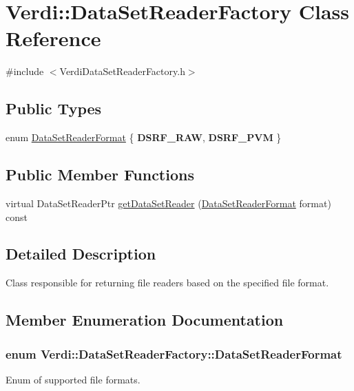 \hypertarget{class_verdi_1_1_data_set_reader_factory}{\section{\-Verdi\-:\-:\-Data\-Set\-Reader\-Factory \-Class \-Reference}
\label{class_verdi_1_1_data_set_reader_factory}
}


{\ttfamily \#include $<$\-Verdi\-Data\-Set\-Reader\-Factory.\-h$>$}

\subsection*{\-Public \-Types}
\begin{DoxyCompactItemize}
\item 
enum \hyperlink{class_verdi_1_1_data_set_reader_factory_a2c02a5a07ac022affe10410957967910}{\-Data\-Set\-Reader\-Format} \{ {\bfseries \-D\-S\-R\-F\-\_\-\-R\-A\-W}, 
{\bfseries \-D\-S\-R\-F\-\_\-\-P\-V\-M}
 \}
\end{DoxyCompactItemize}
\subsection*{\-Public \-Member \-Functions}
\begin{DoxyCompactItemize}
\item 
virtual \-Data\-Set\-Reader\-Ptr \hyperlink{class_verdi_1_1_data_set_reader_factory_aad311b871f57cc3ce836c5d08947e845}{get\-Data\-Set\-Reader} (\hyperlink{class_verdi_1_1_data_set_reader_factory_a2c02a5a07ac022affe10410957967910}{\-Data\-Set\-Reader\-Format} format) const 
\end{DoxyCompactItemize}


\subsection{\-Detailed \-Description}
\-Class responsible for returning file readers based on the specified file format. 

\subsection{\-Member \-Enumeration \-Documentation}
\hypertarget{class_verdi_1_1_data_set_reader_factory_a2c02a5a07ac022affe10410957967910}{
\subsubsection[{\-Data\-Set\-Reader\-Format}]{\setlength{\rightskip}{0pt plus 5cm}enum {\bf \-Verdi\-::\-Data\-Set\-Reader\-Factory\-::\-Data\-Set\-Reader\-Format}}}\label{class_verdi_1_1_data_set_reader_factory_a2c02a5a07ac022affe10410957967910}
\-Enum of supported file formats. 

